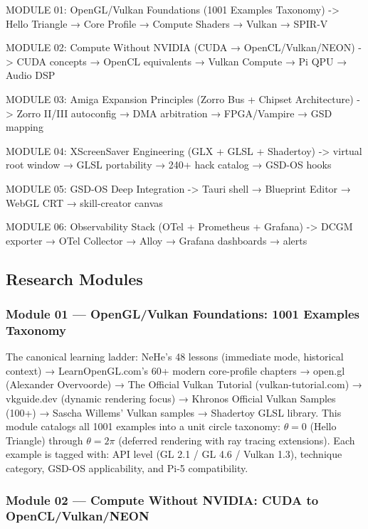 \documentclass[11pt,letterpaper]{article}
\begin{document}
\begin{asciibox}
MODULE 01: OpenGL/Vulkan Foundations (1001 Examples Taxonomy)
  -> Hello Triangle → Core Profile → Compute Shaders → Vulkan → SPIR-V

MODULE 02: Compute Without NVIDIA (CUDA → OpenCL/Vulkan/NEON)
  -> CUDA concepts → OpenCL equivalents → Vulkan Compute → Pi QPU → Audio DSP

MODULE 03: Amiga Expansion Principles (Zorro Bus + Chipset Architecture)
  -> Zorro II/III autoconfig → DMA arbitration → FPGA/Vampire → GSD mapping

MODULE 04: XScreenSaver Engineering (GLX + GLSL + Shadertoy)
  -> virtual root window → GLSL portability → 240+ hack catalog → GSD-OS hooks

MODULE 05: GSD-OS Deep Integration
  -> Tauri shell → Blueprint Editor → WebGL CRT → skill-creator canvas

MODULE 06: Observability Stack (OTel + Prometheus + Grafana)
  -> DCGM exporter → OTel Collector → Alloy → Grafana dashboards → alerts
\end{asciibox}

\subsection{Research Modules}

\subsubsection{Module 01 — OpenGL/Vulkan Foundations: 1001 Examples Taxonomy}

The canonical learning ladder: NeHe's 48 lessons (immediate mode, historical context) → LearnOpenGL.com's 60+ modern core-profile chapters → open.gl (Alexander Overvoorde) → The Official Vulkan Tutorial (vulkan-tutorial.com) → vkguide.dev (dynamic rendering focus) → Khronos Official Vulkan Samples (100+) → Sascha Willems' Vulkan samples → Shadertoy GLSL library. This module catalogs all 1001 examples into a unit circle taxonomy: $\theta = 0$ (Hello Triangle) through $\theta = 2\pi$ (deferred rendering with ray tracing extensions). Each example is tagged with: API level (GL 2.1 / GL 4.6 / Vulkan 1.3), technique category, GSD-OS applicability, and Pi-5 compatibility.

\subsubsection{Module 02 — Compute Without NVIDIA: CUDA to OpenCL/Vulkan/NEON}
\end{document}
